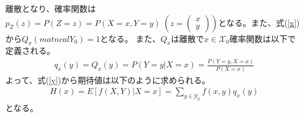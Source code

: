 \documentclass[a4j,12pt]{jarticle}
\begin{document}
離散となり、確率関数は$p_{Z}(z) = P(Z = z) = P(X = x,Y =y) \; (z = \left(\begin{array}{c}x \\ y\end{array} \right))$となる。また、式(\ref{x})から$Q_{x}(matncal{Y}_{0}) = 1$となる。
また、$Q_{x}$は離散で$x \in \mathcal{X}_{0}$確率関数は以下で定義される。
\begin{align}
q_{x}(y) = Q_{x}({y}) = P(Y = y|X=x) = \frac{P(Y = y,X = x)}{P(X=x)}
\end{align}
よって、式(\ref{y})から期待値は以下のように求められる。
\begin{align*}
H(x) = E[f(X,Y) | X = x] = \sum_{y \in \mathcal{Y}_{0}}f(x,y)q_{x}(y)
\end{align*}
となる。
\end{document}
